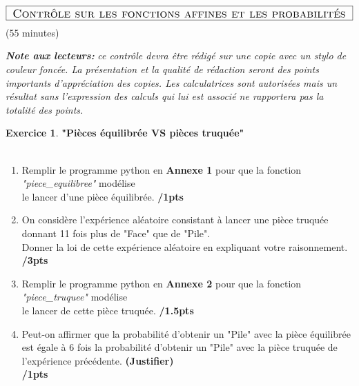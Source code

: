 \documentclass[a4paper,11pt]{article}
\theoremstyle{definition}
\newtheorem{exo}{Exercice}
\begin{document}
\chead{}\renewcommand{\headrulewidth}{0.4pt}\renewcommand{\footrulewidth}{0.4pt}

\hfill\\[-0.7cm]
$$	\fbox{\text{\Large{ \sc Contrôle sur les fonctions affines et les probabilités }}}$$
\centering \Large{ (55 minutes) }\\[0.5cm]

\flushleft\normalsize


\textbf{\textit{Note aux lecteurs:}} \textit{ce contrôle devra être rédigé sur une copie avec un stylo de couleur foncée. La présentation et la qualité de rédaction seront des points importants d'appréciation des copies.  Les calculatrices sont autorisées mais un résultat sans l'expression des calculs qui lui est associé ne rapportera pas la totalité des points.}\\[0.7cm]

\begin{exo} \textbf{"Pièces équilibrée VS pièces truquée"}\\\hfil\\

	\begin{enumerate}%
		\item Remplir le programme python en \textbf{Annexe 1} pour que la fonction \emph{"piece\_equilibree" } modélise \\le lancer d'une pièce équilibrée. \hfill\textbf{/1pts}
		\item On considère l'expérience aléatoire consistant à lancer une pièce truquée donnant 11 fois plus de "Face" que de "Pile".\\ Donner la loi de cette expérience aléatoire en expliquant votre raisonnement. \hfill\textbf{/3pts}
		\item Remplir le programme python en \textbf{Annexe 2} pour que la fonction \emph{"piece\_truquee" } modélise\\ le lancer de cette pièce truquée. \hfill\textbf{/1.5pts}
		\item Peut-on affirmer que la probabilité d'obtenir un "Pile" avec la pièce équilibrée est égale à 6 fois la probabilité d'obtenir un "Pile" avec la pièce truquée de l'expérience précédente. \textbf{(Justifier)} \\\hfill\textbf{/1pts}
	\end{enumerate}
\end{exo}
	
\end{document}
